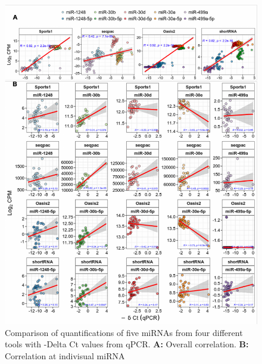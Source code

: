 \documentclass[12pt,twoside]{reedthesis}
\begin{document}
\begin{figure}[htbp]

{\centering \includegraphics{thesis_files/figure-latex/3f17-1} 

}

\caption{Comparison of quantifications of five miRNAs from four different tools with -Delta Ct values from qPCR. \textbf{A:} Overall correlation. \textbf{B:} Correlation at indivisual miRNA}\label{fig:3f17}
\end{figure}
\end{document}
